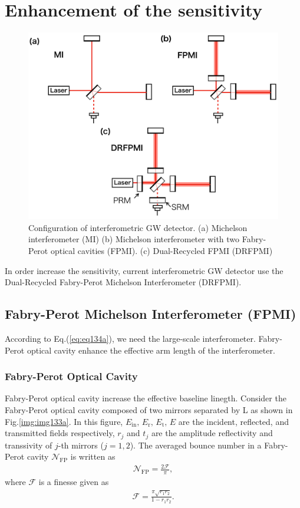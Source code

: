 \newpage
\section{Enhancement of the sensitivity}
\begin{figure}[h]
  \begin{center}   
    \includegraphics[width=14cm]{./img_chap1/img133.png}
    \caption{Configuration of interferometric GW detector. (a) Michelson interferometer (MI) (b) Michelson interferometer with two Fabry-Perot optical cavities (FPMI). (c) Dual-Recycled FPMI (DRFPMI)} \label{img:img133}
  \end{center}
\end{figure}
In order increase the sensitivity, current interferometric GW detector use the Dual-Recycled Fabry-Perot Michelson Interferometer (DRFPMI). 


\subsection{Fabry-Perot Michelson Interferometer (FPMI)}
According to Eq.(\ref{eq:eq134a}), we need the large-scale interferometer. Fabry-Perot optical cavity enhance the effective arm length of the interferometer.

\subsubsection{Fabry-Perot Optical Cavity}
Fabry-Perot optical cavity increase the effective baseline linegth. Consider the Fabry-Perot optical cavity composed of two mirrors separated by L as shown in Fig.\ref{img:img133a}. In this figure, $E_{\mathrm{in}},\,E_{\mathrm{r}},\,E_{\mathrm{t}},\,E$ are the incident, reflected, and transmitted fields respectively, $r_{j}$ and $t_{j}$ are the amplitude reflectivity and transsivity of $j$-th mirrors ($j=1,2$). The averaged bounce number in a Fabry-Perot cavity $\mathcal{N}_{\mathrm{FP}}$ is written as \cite{ando1999power}
\begin{eqnarray}
  \mathcal{N}_{\mathrm{FP}} = \frac{2\mathcal{F}}{\pi},
\end{eqnarray}
where $\mathcal{F}$ is a finesse given as
\begin{eqnarray}
  \mathcal{F}=\frac{\pi \sqrt{r_{1} r_{2}}}{1-r_{1} r_{2}}.
\end{eqnarray}

